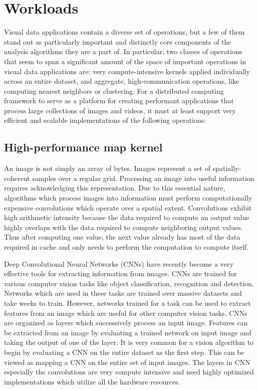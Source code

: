 \documentclass[tog]{acmsiggraph}
\begin{document}
\section{Workloads}
Visual data applications contain a diverse set of operations, but a few of them
stand out as particularly important and distinctly core components of the
analysis algorithms they are a part of. In particular, two classes
of operations that seem to span a significant amount of the space of important
operations in visual data applications are: very compute-intensive kernels
applied individually across an entire dataset, and aggregate,
high-communication operations, like computing nearest neighbors or
clustering. For a distributed computing framework to serve as a platform for
creating performant applications that process large collections of images and
videos, it must at least support very efficient and scalable implementations of
the following operations:

\subsection{High-performance map kernel}
An image is not simply an array of bytes. Images represent a set of
spatially-coherent samples over a regular grid. Processing an image into useful
information requires acknowledging this representation. Due to this essential
nature, algorithms which process images into information must perform
computationally expensive convolutions which operate over a spatial
extent. Convolutions exhibit high arithmetic intensity because the data
required to compute an output value highly overlaps with the data required to
compute neighboring output values. Thus after computing one value, the next
value already has most of the data required in cache and only needs to
perform the computation to compute itself.

Deep Convolutional Neural Networks (CNNs) have recently become a very effective
tools for extracting information from images. CNNs are trained for various
computer vision tasks like object classification, recognition and detection.
Networks which are used in these tasks are trained over massive datasets and
take weeks to train. However, networks trained for a task can be used to extract
features from an image which are useful for other computer vision tasks. CNNs
are organized as layers which successively process an input image. Features can
be extracted from an image by evaluating a trained network on input image and
taking the output of one of the layer. It is very common for a vision algorithm
to begin by evaluating a CNN on the entire dataset as the first step. This can
be viewed as mapping a CNN on the entire set of input images. The layers in CNN
especially the convolutions are very compute intensive and need highly optimized
implementations which utilize all the hardware resources.
\end{document}

